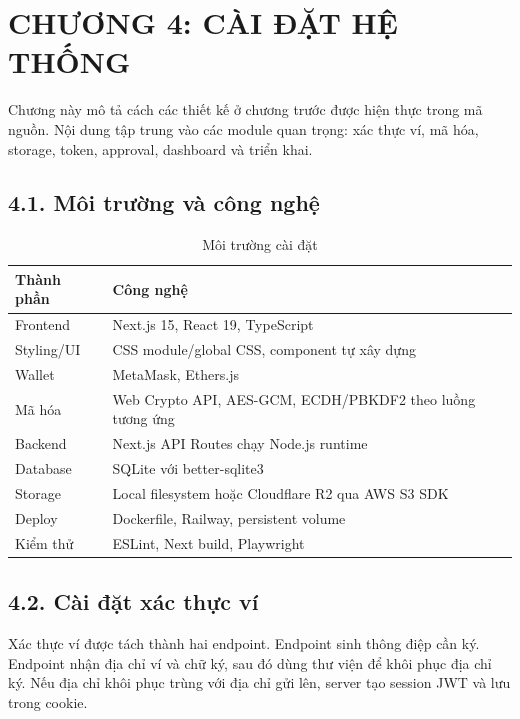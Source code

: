 \chapter*{CHƯƠNG 4: CÀI ĐẶT HỆ THỐNG}
{}

Chương này mô tả cách các thiết kế ở chương trước được hiện thực trong mã nguồn. Nội dung tập trung vào các module quan trọng: xác thực ví, mã hóa, storage, token, approval, dashboard và triển khai.

\section*{4.1. Môi trường và công nghệ}
{}

\begin{table}[H]
\centering
\caption{Môi trường cài đặt}
\begin{tabularx}{\textwidth}{|p{4cm}|X|}
\hline
\textbf{Thành phần} & \textbf{Công nghệ} \\ \hline
Frontend & Next.js 15, React 19, TypeScript \\ \hline
Styling/UI & CSS module/global CSS, component tự xây dựng \\ \hline
Wallet & MetaMask, Ethers.js \\ \hline
Mã hóa & Web Crypto API, AES-GCM, ECDH/PBKDF2 theo luồng tương ứng \\ \hline
Backend & Next.js API Routes chạy Node.js runtime \\ \hline
Database & SQLite với better-sqlite3 \\ \hline
Storage & Local filesystem hoặc Cloudflare R2 qua AWS S3 SDK \\ \hline
Deploy & Dockerfile, Railway, persistent volume \\ \hline
Kiểm thử & ESLint, Next build, Playwright \\ \hline
\end{tabularx}
\end{table}

\section*{4.2. Cài đặt xác thực ví}
{}

Xác thực ví được tách thành hai endpoint. Endpoint  sinh thông điệp cần ký. Endpoint  nhận địa chỉ ví và chữ ký, sau đó dùng thư viện  để khôi phục địa chỉ ký. Nếu địa chỉ khôi phục trùng với địa chỉ gửi lên, server tạo session JWT và lưu trong cookie.

